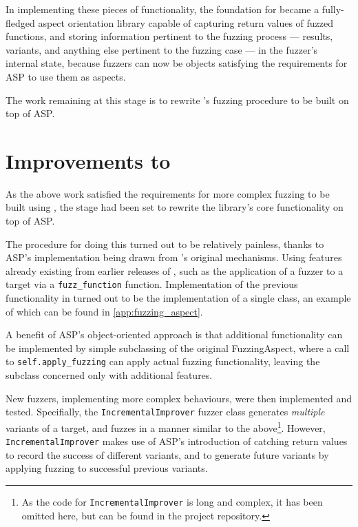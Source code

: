 \documentclass[draft]{article}
\begin{document}
In implementing these pieces of functionality, the foundation for \pdsf{}
became a fully-fledged aspect orientation library capable of capturing return
values of fuzzed functions, and storing information pertinent to the fuzzing
process --- results, variants, and anything else pertinent to the fuzzing case
--- in the fuzzer's internal state, because fuzzers can now be objects
satisfying the requirements for ASP to use them as aspects.\par

The work remaining at this stage is to rewrite \pdsf{}'s fuzzing procedure to
be built on top of ASP.\par



\section{Improvements to \pdsf{}}
\label{sec:pdsf_improvements}
As the above work satisfied the requirements for more complex fuzzing to be
built using \pdsf{}, the stage had been set to rewrite the library's core
functionality on top of ASP.\par

The procedure for doing this turned out to be relatively painless, thanks to
ASP's implementation being drawn from \pdsf{}'s original mechanisms. Using
features already existing from earlier releases of \pdsf{}, such as the
application of a fuzzer to a target via a \texttt{fuzz\_function} function.
Implementation of the previous functionality in \pdsf{} turned out to be the
implementation of a single class, an example of which can be found in
\cref{app:fuzzing_aspect}.\par


A benefit of ASP's object-oriented approach is that additional functionality can
be implemented by simple subclassing of the original FuzzingAspect, where a call
to \texttt{self.apply\_fuzzing} can apply actual fuzzing functionality, leaving
the subclass concerned only with additional features.\par

New fuzzers, implementing more complex behaviours, were then implemented and
tested. Specifially, the \texttt{IncrementalImprover} fuzzer class generates
\emph{multiple} variants of a target, and fuzzes in a manner similar to the
above\footnote{As the code for \texttt{IncrementalImprover} is long and complex,
  it has been omitted here, but can be found in the project
  repository\cite{pydysofu_repo}.}. However, \texttt{IncrementalImprover} makes use
of ASP's introduction of catching return values to record the success of
different variants, and to generate future variants by applying fuzzing to
successful previous variants.\par
\end{document}
